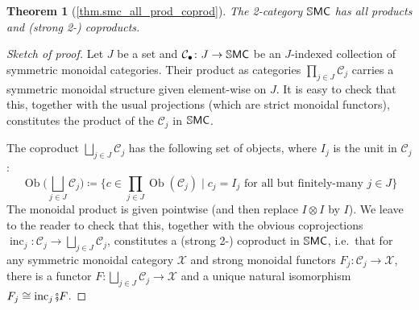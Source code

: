 \documentclass[11pt, oneside, article]{memoir}
\theoremstyle{plain}
\newtheorem*{theorem*}{Theorem}
\theoremstyle{definition}
\theoremstyle{remark}
\newcommand{\Set}[1]{\mathrm{#1}}%
\newcommand{\cat}[1]{\mathcal{#1}}%
\newcommand{\Cat}[1]{{\mathsf{#1}}}%
\newcommand{\CCat}[1]{\mathbb{\StrLeft{#1}{1}}\Cat{\StrGobbleLeft{#1}{1}}}%
\DeclareMathOperator{\ob}{\Set{Ob}}
\DeclareMathOperator{\inc}{inc}
\newcommand{\ssmc}{\CCat{SMC}}
\newcommand{\cp}{\mathbin{\fatsemi}}
\begin{document}
\begin{theorem*}[\ref{thm.smc_all_prod_coprod}]\label{page.smc_all_prod_coprod}
The 2-category $\ssmc$ has all products and (strong 2-) coproducts.
\end{theorem*}
\begin{proof}[Sketch of proof]
Let $J$ be a set and $\cat{C}_\bullet\colon J\to\ssmc$ be an $J$-indexed collection of symmetric monoidal categories. Their product as categories $\prod_{j\in J}\cat{C}_j$ carries a symmetric monoidal structure given element-wise on $J$. It is easy to check that this, together with the usual projections (which are strict monoidal functors), constitutes the product of the $\cat{C}_j$ in $\ssmc$.

The coproduct $\bigsqcup_{j\in J}\cat{C}_j$ has the following set of objects, where $I_j$ is the unit in $\cat{C}_j$:
\[
\ob\bigg(\bigsqcup_{j\in J}\cat{C}_j\bigg)\coloneqq
\bigg\{
c\in\prod_{j\in J}\ob(\cat{C}_j)
\;\bigg|\;
c_j=I_j\text{ for all but finitely-many }j\in J
\bigg\}
\]
The monoidal product is given pointwise (and then replace $I\otimes I$ by $I$). We leave to the reader to check that this, together with the obvious coprojections $\inc_j\colon\cat{C}_j\to\bigsqcup_{j\in J}\cat{C}_j$, constitutes a (strong 2-) coproduct in $\ssmc$, i.e.\ that for any symmetric monoidal category $\cat{X}$ and strong monoidal functors $F_j\colon\cat{C}_j\to\cat{X}$, there is a functor $F\colon\bigsqcup_{j\in J}\cat{C}_j\to\cat{X}$ and a unique natural isomorphism $F_j\cong\inc_j\cp F$.
\end{proof}




\printbibliography
\end{document}
